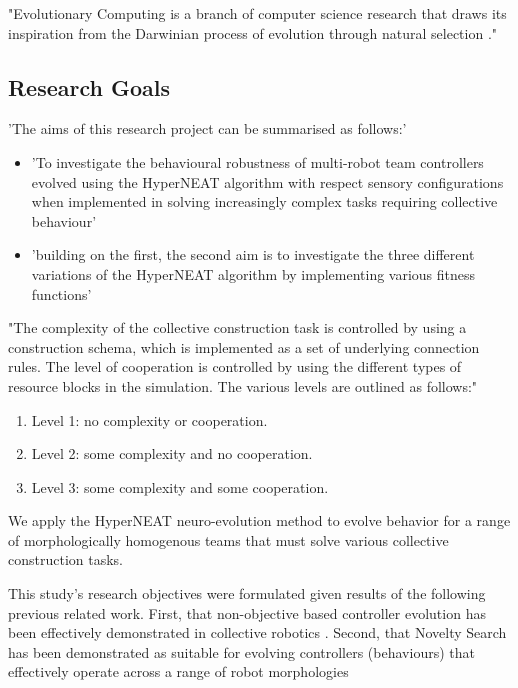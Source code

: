 

"Evolutionary Computing is a branch of computer science research  that draws its inspiration from the Darwinian process of evolution through natural selection \cite{EibenSmith2003}."



\subsection{Research Goals}

'The aims of this research project can be summarised as follows:'
\begin{itemize}
	\item 'To investigate the behavioural robustness of multi-robot team controllers evolved using the HyperNEAT algorithm with respect sensory configurations when implemented in solving increasingly complex tasks requiring collective behaviour'
	\item 'building on the first, the second aim is to investigate the three different variations of the HyperNEAT algorithm by implementing various fitness functions'
\end{itemize}

"The complexity of the collective construction task is controlled by using a construction schema, which is implemented as a set of underlying connection rules. The level of cooperation is controlled by using the different types of resource blocks in the simulation.
The various levels are outlined as follows:"
\begin{enumerate}
	\item Level 1: no complexity or cooperation.
	\item Level 2: some complexity and no cooperation.
	\item Level 3: some complexity and some cooperation.
\end{enumerate}

We apply the HyperNEAT \cite{StanleyDAmbrosioGauci2009} neuro-evolution method to evolve
behavior for a range of morphologically homogenous teams that must solve various collective construction tasks.

This study's research objectives were formulated given results of the following previous related work. First, that non-objective based controller evolution has been effectively demonstrated in collective robotics \cite{RefWorks:11, gomes2013generic, RefWorks:5}.
Second, that Novelty Search has been demonstrated as suitable for evolving controllers (behaviours) that effectively operate across a range of robot morphologies


